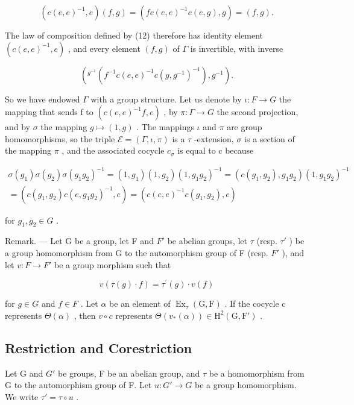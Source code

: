 \[
(c (e, e) ^ {- 1}, e) (f, g) = (f c (e, e) ^ {- 1} c (e, g), g) = (f, g).
\]

The law of composition defined by (12) therefore has identity element \((c(e,e)^{-1},e)\) , and every element \((f,g)\) of \(\Gamma\) is invertible, with inverse

\[
\left(^ {g ^ {- 1}} (f ^ {- 1} c (e, e) ^ {- 1} c (g, g ^ {- 1}) ^ {- 1}), g ^ {- 1}\right).
\]

So we have endowed \(\Gamma\) with a group structure. Let us denote by \(\iota: F \to G\) the mapping that sends f to \((c(e, e)^{-1}f, e)\) , by \(\pi: \Gamma \to G\) the second projection, and by \(\sigma\) the mapping \(g \mapsto (1, g)\) . The mappings \(\iota\) and \(\pi\) are group homomorphisms, so the triple \(\mathcal{E} = (\Gamma, \iota, \pi)\) is a \(\tau\) -extension, \(\sigma\) is a section of the mapping \(\pi\) , and the associated cocycle \(c_{\sigma}\) is equal to c because

\[
\begin{array}{c} \sigma (g _ {1}) \sigma (g _ {2}) \sigma (g _ {1} g _ {2}) ^ {- 1} = (1, g _ {1}) (1, g _ {2}) (1, g _ {1} g _ {2}) ^ {- 1} = (c (g _ {1}, g _ {2}), g _ {1} g _ {2}) (1, g _ {1} g _ {2}) ^ {- 1} \\ = (c (g _ {1}, g _ {2}) c (e, g _ {1} g _ {2}) ^ {- 1}, e) = (c (e, e) ^ {- 1} c (g _ {1}, g _ {2}), e) \end{array}
\]

for \(g_{1}, g_{2} \in G\) .

Remark. --- Let G be a group, let F and \(F'\) be abelian groups, let \(\tau\) (resp. \(\tau'\) ) be a group homomorphism from G to the automorphism group of F (resp. \(F'\) ), and let \(v : F \to F'\) be a group morphism such that

\[
v (\tau (g) \cdot f) = \tau^ {\prime} (g) \cdot v (f)\tag{13}
\]

for \(g \in G\) and \(f \in F\) . Let \(\alpha\) be an element of \(\operatorname{Ex}_{\tau}(\mathrm{G}, \mathrm{F})\) . If the cocycle c represents \(\Theta(\alpha)\) , then \(v \circ c\) represents \(\Theta(v_{*}(\alpha)) \in \mathrm{H}^{2}(\mathrm{G}, \mathrm{F}')\) .

\subsection{Restriction and Corestriction}

Let G and \(G'\) be groups, F be an abelian group, and \(\tau\) be a homomorphism from G to the automorphism group of F. Let \(u: G' \to G\) be a group homomorphism. We write \(\tau' = \tau \circ u\) .

